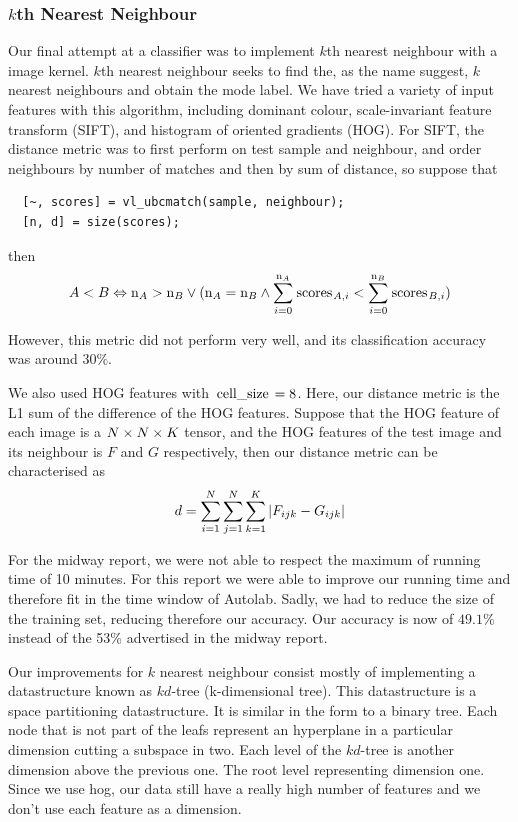 \documentclass{article} %
\begin{document}
\subsubsection{$k$th Nearest Neighbour}
Our final attempt at a classifier was to implement $k$th nearest neighbour with a image kernel. $k$th nearest neighbour seeks to find the, as the name suggest, $k$ nearest neighbours and obtain the mode label. We have tried a variety of input features with this algorithm, including dominant colour, scale-invariant feature transform (SIFT), and histogram of oriented gradients (HOG). For SIFT, the distance metric was to first perform  on test sample and neighbour, and order neighbours by number of matches and then by sum of distance, so suppose that
\begin{lstlisting}
  [~, scores] = vl_ubcmatch(sample, neighbour);
  [n, d] = size(scores);
\end{lstlisting}
then
$$A < B \eqv \codem{n}_A>\codem{n}_B \/ (\codem{n}_A=\codem{n}_B\+\summ{i=0}{\codem{n}_A}{\codem{scores}_{A,i}}<\summ{i=0}{\codem{n}_B}{\codem{scores}_{B,i}})$$

However, this metric did not perform very well, and its classification accuracy was around $30\%$.

We also used HOG features with $\codem{cell_size}=8$. Here, our distance metric is the L1 sum of the difference of the HOG features. Suppose that the HOG feature of each image is a $N\x N\x K$ tensor, and the HOG features of the test image and its neighbour is $F$ and $G$ respectively, then our distance metric can be characterised as
$$d=\summ{i=1}{N}\summ{j=1}{N}\summ{k=1}{K}|F_{ijk}-G_{ijk}|$$

For the midway report, we were not able to respect the maximum of running time of 10 minutes. For this report we were able to improve our running time and therefore fit in the time window of Autolab. Sadly, we had to reduce the size of the training set, reducing therefore our accuracy. Our accuracy is now of $49.1\%$ instead of the 53\% advertised in the midway report.

Our improvements for  $k$ nearest neighbour consist mostly of implementing a datastructure known as $kd$-tree (k-dimensional tree). This datastructure is a space partitioning datastructure. It is similar in the form to a binary tree. Each node that is not part of the leafs represent an hyperplane in a particular dimension cutting a subspace in two. Each level of the $kd$-tree is another dimension above the previous one. The root level representing dimension one. Since we use hog, our data still have a really high number of features and we don't use each feature as a dimension. 
\end{document}
